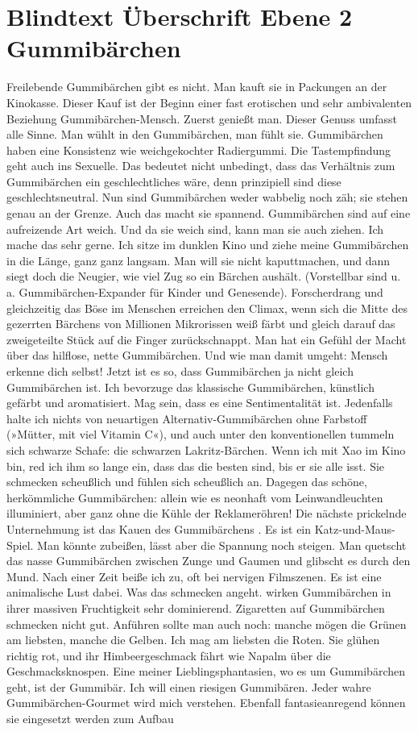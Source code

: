 \documentclass[
	english,
	ruledheaders=section,%
	class=report,%
	thesis={type=bachelor},%
	accentcolor=1b,%
	custommargins=true,%
	marginpar=false,%
	parskip=half-,%
	fontsize=11pt,%
	DIV=14,
]{tudapub}
\begin{document}
\section{Blindtext Überschrift Ebene 2 Gummibärchen}
Freilebende Gummibärchen gibt es nicht. Man kauft sie in Packungen an der Kinokasse. Dieser Kauf ist der Beginn einer fast erotischen und sehr ambivalenten Beziehung Gummibärchen-Mensch. Zuerst genießt man. Dieser Genuss umfasst alle Sinne. Man wühlt in den Gummibärchen, man fühlt sie. Gummibärchen haben eine Konsistenz wie weichgekochter Radiergummi. Die Tastempfindung geht auch ins Sexuelle. Das bedeutet nicht unbedingt, dass das Verhältnis zum Gummibärchen ein geschlechtliches wäre, denn prinzipiell sind diese geschlechtsneutral. Nun sind Gummibärchen weder wabbelig noch zäh; sie stehen genau an der Grenze. Auch das macht sie spannend. Gummibärchen sind auf eine aufreizende Art weich. Und da sie weich sind, kann man sie auch ziehen. Ich mache das sehr gerne. Ich sitze im dunklen Kino und ziehe meine Gummibärchen in die Länge, ganz ganz langsam. Man will sie nicht kaputtmachen, und dann siegt doch die Neugier, wie viel Zug so ein Bärchen aushält. (Vorstellbar sind u. a. Gummibärchen-Expander für Kinder und Genesende). Forscherdrang und gleichzeitig das Böse im Menschen erreichen den Climax, wenn sich die Mitte des gezerrten Bärchens von Millionen Mikrorissen weiß färbt und gleich darauf das zweigeteilte Stück auf die Finger zurückschnappt. Man hat ein Gefühl der Macht über das hilflose, nette Gummibärchen. Und wie man damit umgeht: Mensch erkenne dich selbst! Jetzt ist es so, dass Gummibärchen ja nicht gleich Gummibärchen ist. Ich bevorzuge das klassische Gummibärchen, künstlich gefärbt und aromatisiert. Mag sein, dass es eine Sentimentalität ist. Jedenfalls halte ich nichts von neuartigen Alternativ-Gummibärchen ohne Farbstoff (»Mütter, mit viel Vitamin C«), und auch unter den konventionellen tummeln sich schwarze Schafe: die schwarzen Lakritz-Bärchen. Wenn ich mit Xao im Kino bin, red ich ihm so lange ein, dass das die besten sind, bis er sie alle isst. Sie schmecken scheußlich und fühlen sich scheußlich an. Dagegen das schöne, herkömmliche Gummibärchen: allein wie es neonhaft vom Leinwandleuchten illuminiert, aber ganz ohne die Kühle der Reklameröhren! Die nächste prickelnde Unternehmung ist das Kauen des Gummibärchens \parencite{arbelaez2010contour}. Es ist ein Katz-und-Maus-Spiel. Man könnte zubeißen, lässt aber die Spannung noch steigen. Man quetscht das nasse Gummibärchen zwischen Zunge und Gaumen und glibscht es durch den Mund. Nach einer Zeit beiße ich zu, oft bei nervigen Filmszenen. Es ist eine animalische Lust dabei. Was das schmecken angeht. wirken Gummibärchen in ihrer massiven Fruchtigkeit sehr dominierend. Zigaretten auf Gummibärchen schmecken nicht gut. Anführen sollte man auch noch: manche mögen die Grünen am liebsten, manche die Gelben. Ich mag am liebsten die Roten. Sie glühen richtig rot, und ihr Himbeergeschmack fährt wie Napalm über die Geschmacksknospen. Eine meiner Lieblingsphantasien, wo es um Gummibärchen geht, ist der Gummibär. Ich will einen riesigen Gummibären. Jeder wahre Gummibärchen-Gourmet wird mich verstehen. Ebenfall fantasieanregend können sie eingesetzt werden zum Aufbau 
\end{document}

